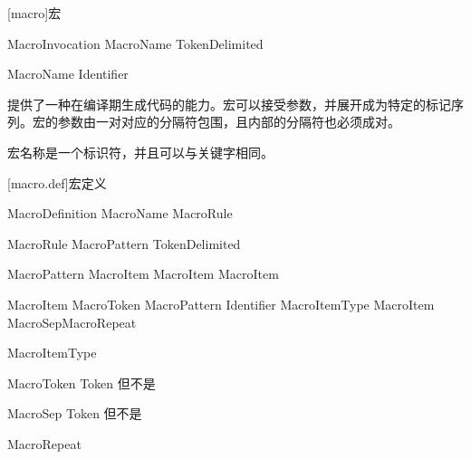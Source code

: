 
[macro]{宏}

\begin{bnf}{MacroInvocation}
    \terminal{\#} MacroName TokenDelimited\bnfq
\end{bnf}

\begin{bnf}{MacroName}
    Identifier
\end{bnf}

\pnum
{}提供了一种在编译期生成代码的能力。宏可以接受参数，并展开成为特定的标记序列。宏的参数由一对对应的分隔符包围，且内部的分隔符也必须成对。

\pnum
宏名称是一个标识符，并且可以与关键字相同。

[macro.def]{宏定义}

\begin{bnf}{MacroDefinition}
     MacroName \terminal{\{} MacroRule\bnfs \terminal{\}}
\end{bnf}

\begin{bnf}{MacroRule}
    MacroPattern \terminal{->} TokenDelimited
\end{bnf}

\begin{bnf}{MacroPattern}
    \terminal{(} MacroItem\bnfs \terminal{)} \br
    \terminal{[} MacroItem\bnfs \terminal{]} \br
    \terminal{\{} MacroItem\bnfs \terminal{\}}
\end{bnf}

\begin{bnf}{MacroItem}
    MacroToken \br
    MacroPattern \br
    \terminal{\#} Identifier \terminal{:} MacroItemType \br
    \terminal{\#} \terminal{(} MacroItem\bnfp \terminal{)} MacroSep\bnfs MacroRepeat
\end{bnf}

\begin{bnf}{MacroItemType}{\oneof}
\end{bnf}

\begin{bnf}{MacroToken}
    Token \textnormal{但不是} \terminal{( ) [ ] \{ \}}
\end{bnf}

\begin{bnf}{MacroSep}
    Token \textnormal{但不是} 
\end{bnf}

\begin{bnf}{MacroRepeat}{\oneof}
\end{bnf}

